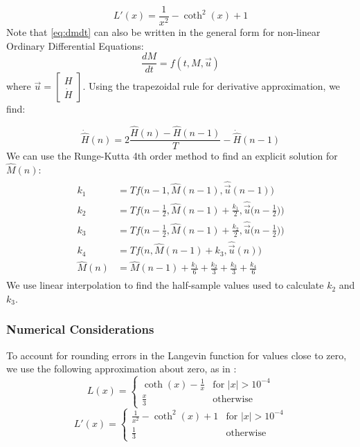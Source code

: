 \documentclass[twoside,a4paper]{article}
\begin{document}
\begin{equation}
    L'(x) = \frac{1}{x^2} - \coth^2(x) + 1
\end{equation}
%
Note that \cref{eq:dmdt} can also be written in the general form for non-linear
Ordinary Differential Equations:
\begin{equation}
    \frac{dM}{dt} = f(t,M,\vec{u})
\end{equation}
where $\vec{u} = \begin{bmatrix}
    H \\
    \dot{H}
    \end{bmatrix}$.
\newline\newline
Using the trapezoidal rule for derivative approximation, we find:

\begin{equation}
    \dot{\hat{H}}(n) = 2\frac{\hat{H}(n) - \hat{H}(n-1)}{T} - \dot{\hat{H}}(n-1)
    \label{eq:hDeriv}
\end{equation}
%
We can use the Runge-Kutta 4th order method \cite{Yeh} to find an explicit solution
for $\hat{M}(n)$:
\begin{align}
\begin{split}
    k_1 &= T f \Big(n-1, \hat{M}(n-1), \hat{\vec{u}}(n-1) \Big)\\
    k_2 &= T f \Big(n - \frac{1}{2}, \hat{M}(n-1) + \frac{k_1}{2}, \hat{\vec{u}}  \Big(n-\frac{1}{2} \Big) \Big)\\
    k_3 &= T f \Big(n- \frac{1}{2}, \hat{M}(n-1) + \frac{k_2}{2}, \hat{\vec{u}} \Big(n-\frac{1}{2} \Big) \Big)\\
    k_4 &= T f \Big(n, \hat{M}(n-1) + k_3, \hat{\vec{u}}(n) \Big)\\
    \hat{M}(n) &= \hat{M}(n-1) + \frac{k_1}{6} + \frac{k_2}{3} + \frac{k_3}{3} + \frac{k_4}{6}
    \label{eq:Mn}
\end{split}
\end{align}
%
We use linear interpolation to find the half-sample values used to calculate $k_2$ and $k_3$.

\subsubsection{Numerical Considerations}
To account for rounding errors in the Langevin function for values close to 
zero, we use the following approximation about zero, as in \cite{Hysteresis}:
\begin{equation}
    L(x) = \begin{cases}
        \coth(x) - \frac{1}{x} & \text{for $|x| > 10^{-4}$} \\
        \frac{x}{3} & \text{otherwise}
    \end{cases}
\end{equation}
\begin{equation}
    L'(x) = \begin{cases}
        \frac{1}{x^2} - \coth^{2}(x) + 1 & \text{for $|x| > 10^{-4}$} \\
        \frac{1}{3} & \text{otherwise}
    \end{cases}
\end{equation}
\end{document}

